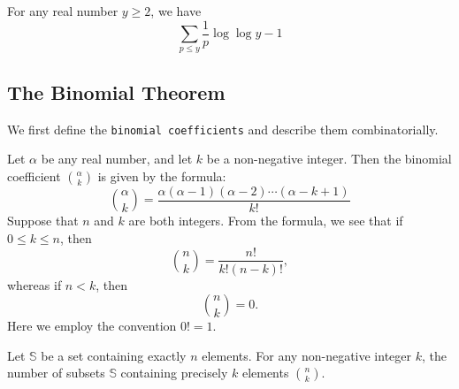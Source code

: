 \documentclass[11pt]{article}
\begin{document}
\begin{theorem}\label{1.19}
    For any real number \(y \geqslant 2\), we have
    \[\sum_{p \leqslant y} \frac{1}{p} \log \log y - 1\]
\end{theorem}

\subsection{The Binomial Theorem}
We first define the \texttt{binomial coefficients} and describe them
combinatorially.

\begin{definition}
    Let \(\alpha\) be any real number, and let \(k\) be a non-negative integer. Then the binomial coefficient \(\binom{\alpha}{k}\) is given by the formula:
    \[
        \binom{\alpha}{k} = \frac{\alpha(\alpha - 1)(\alpha - 2) \cdots (\alpha - k + 1)}{k!}
    \]
    Suppose that \(n\) and \(k\) are both integers. From the formula, we see that
    if \(0 \leq k \leq n\), then
    \[
        \binom{n}{k} = \frac{n!}{k!(n - k)!},
    \]
    whereas if \(n < k\), then
    \[
        \binom{n}{k} = 0.
    \]
    Here we employ the convention \(0! = 1\).
\end{definition}

\begin{theorem}\label{1.20}
    Let \(\mathbb{S}\) be a set containing exactly \(n\) elements. For any non-negative integer \(k\), the number of subsets \(\mathbb{S}\) containing precisely \(k\) elements \(\binom{n}{k}\).
\end{theorem}
\end{document}
